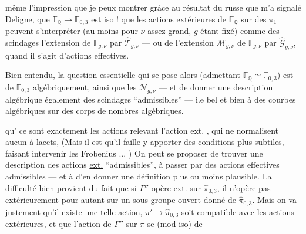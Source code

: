 même l'impression que je peux montrer grâce au résultat du russe que m'a signalé Deligne,  que $\mathbb{\Gamma}_{\mathbb Q}\longrightarrow\mathbb{\Gamma}_{0,3}$ est iso !   que les actions extérieures de $\mathbb{\Gamma}_{\mathbb Q}$ sur des $\pi_1$  peuvent s'interpréter (au moins pour $\nu$ assez grand, $g$ étant fixé) comme des scindages  l'extension  de $\mathbb{\Gamma}_{g,\nu}$ par $\widehat{\mathcal T}_{g,\nu}$ — ou de l'extension $\mathcal M_{g,\nu}$ de $\mathbb{\Gamma}_{g,\nu}$ par $\widehat{\mathcal G}_{g,\nu}$, quand il s'agit d'actions effectives.

Bien entendu, la question essentielle qui se pose alors (admettant $\mathbb{\Gamma}_{\mathbb Q}\simeq\mathbb{\Gamma}_{0,3}$) est de  $\mathbb{\Gamma}_{0,3}$ algébriquement, ainsi que les $\mathcal N_{g,\nu}$ — et de donner une description algébrique également des scindages ``admissibles'' — i.e  bel et bien à des courbes algébriques sur des corps de nombres algébriques.


qu' ce sont exactement les actions relevant l'action ext. , qui ne normalisent aucun  à lacets,  (Mais il est  qu'il faille y apporter des conditions plus subtiles, faisant intervenir les Frobenius ... ) On peut se proposer de trouver une description des actions \uline{ext.} ``admissibles'',   à passer par des actions effectives admissibles — et à \linebreak{} d'en donner une définition plus ou moins plausible. La difficulté bien  provient du fait que si $\Gamma''$ opère \uline{ext.} sur  $\widehat{\pi}_{0,3}$, il n'opère pas extérieurement pour autant sur un sous-groupe ouvert donné  de $\widehat{\pi}_{0,3}$. Mais on va  justement qu'il \uline{existe} une telle action,    $\pi'\longrightarrow\widehat{\pi}_{0,3}$ soit compatible avec les actions extérieures, et que l'action de $\Gamma''$ sur $\pi$ se  (mod iso) de
